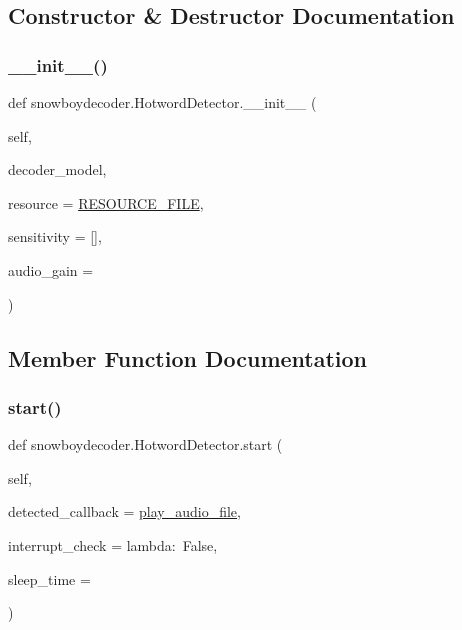 \subsection{Constructor \& Destructor Documentation}
\mbox{\label{classsnowboydecoder_1_1HotwordDetector_a22091f02a8fea2f6065f8bc45addf7fc}} 
\subsubsection{\texorpdfstring{\+\_\+\+\_\+init\+\_\+\+\_\+()}{\_\_init\_\_()}}
{\footnotesize\ttfamily def snowboydecoder.\+Hotword\+Detector.\+\_\+\+\_\+init\+\_\+\+\_\+ (\begin{DoxyParamCaption}\item[{}]{self,  }\item[{}]{decoder\+\_\+model,  }\item[{}]{resource = {\ttfamily \hyperlink{namespacesnowboydecoder_ae9aa648d909800942df02cc34b56b83a}{R\+E\+S\+O\+U\+R\+C\+E\+\_\+\+F\+I\+LE}},  }\item[{}]{sensitivity = {\ttfamily \mbox{[}\mbox{]}},  }\item[{}]{audio\+\_\+gain = {} }\end{DoxyParamCaption})}



\subsection{Member Function Documentation}
\mbox{\label{classsnowboydecoder_1_1HotwordDetector_a0b753c51c1a02be091a7673870cd74e6}} 
\subsubsection{\texorpdfstring{start()}{start()}}
{\footnotesize\ttfamily def snowboydecoder.\+Hotword\+Detector.\+start (\begin{DoxyParamCaption}\item[{}]{self,  }\item[{}]{detected\+\_\+callback = {\ttfamily \hyperlink{namespacesnowboydecoder_a828506a06fcca3526430747208f904aa}{play\+\_\+audio\+\_\+file}},  }\item[{}]{interrupt\+\_\+check = {\ttfamily lambda\+:~False},  }\item[{}]{sleep\+\_\+time = {} }\end{DoxyParamCaption})}

